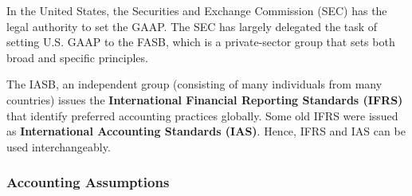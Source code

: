 \documentclass[../main.tex]{subfiles}
\begin{document}
	In the United States, the Securities and Exchange Commission (SEC) has the 
	legal authority to set the GAAP. The SEC has largely delegated the task of 
	setting U.S. GAAP to the FASB, which is a private-sector group that sets 
	both broad and specific principles. 
	
	The IASB, an independent group (consisting of many individuals from many 
	countries) issues the \textbf{International Financial Reporting Standards 
	(IFRS)} that identify preferred accounting practices globally. Some old 
	IFRS were issued as \textbf{International Accounting Standards (IAS)}. 
	Hence, IFRS and IAS can be used interchangeably. 
	
	\subsubsection{Accounting Assumptions}
	
\end{document}
